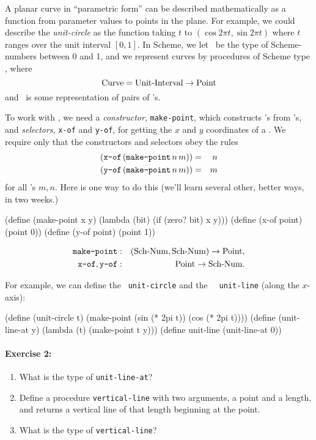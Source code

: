A planar curve in ``parametric form'' can be described mathematically as a
function from parameter values to points in the plane.  For example, we
could describe the {\em unit-circle} as the function taking $t$ to $(\cos
2 \pi t, \sin 2 \pi t)$ where $t$ ranges over the unit interval $[0,1]$.  In Scheme,
we let \UI\ be the type of Scheme-numbers between 0 and 1, and we
represent curves by procedures of Scheme type \CRV, where
\[\mbox{Curve} = \mbox{Unit-Interval}\rightarrow \mbox{Point}\]
and \PT\ is some representation of pairs of \SN's.

To work with \PT, we need a {\em constructor}, {\tt make-point}, which
constructs \PT's from \SN's, and {\em selectors}, {\tt x-of} and {\tt y-of},
for getting the $x$ and $y$ coordinates of a \PT.  We require only that
the constructors and selectors obey the rules
\begin{eqnarray*}
(\hbox{\tt x-of}\, (\hbox{\tt make-point}\, n\, m)) & = & n\\
(\hbox{\tt y-of}\, (\hbox{\tt make-point}\, n\, m)) & = & m
\end{eqnarray*}
for all \SN's $m,n$.  Here is one way to do this (we'll learn several
other, better ways, in two weeks.)

\beginlisp
(define (make-point x y)
  (lambda (bit)
    (if (zero? bit) x y)))
\null
(define (x-of point)
  (point 0))
\null
(define (y-of point)
  (point 1))
\endlisp

\begin{eqnarray*}
\hbox{\tt make-point} & : & (\mbox{Sch-\-Num},\mbox{Sch-\-Num}) \rightarrow \mbox{Point},\\
\hbox{\tt x-of}, \hbox{\tt y-of} & : & \mbox{Point}\rightarrow \mbox{Sch-\-Num}.
\end{eqnarray*}

For example, we can define the \CRV\ {\tt unit-circle} and the \CRV\ {\tt
unit-line} (along the $x$-axis):

\beginlisp
(define (unit-circle t)
  (make-point (sin (* 2pi t))
              (cos (* 2pi t))))
\null
(define (unit-line-at y)
  (lambda (t) (make-point t y)))
\null
(define unit-line (unit-line-at 0))

\endlisp

\paragraph{Exercise 2:}

\begin{enumerate}
\item What is the type of {\tt unit-line-at}?

\item Define a procedure {\tt vertical-line} with two arguments, a point and a
length, and returns a vertical line of that length beginning at the point.

\item What is the type of {\tt vertical-line}?

\end{enumerate}
\medskip

